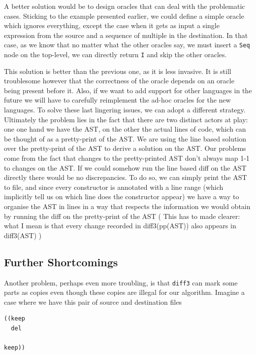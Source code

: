 \documentclass[11pt]{article}
\begin{document}
A better solution would be to design oracles that can deal with the problematic cases. 
Sticking to the example presented earlier, we could define a simple oracle which 
ignores everything, except the case when it gets as input a single expression 
from the source and a sequence of multiple in the destination. In that case, as 
we know that no matter what the other oracles say, we must insert a \texttt{Seq} 
node on the top-level, we can directly return \texttt{I} and skip the other 
oracles. 

This solution is better than the previous one, as it is less invasive. It is 
still troublesome however that the correctness of the oracle depends on an 
oracle being present before it. Also, if we want to add support for other 
languages in the future we will have to carefully reimplement the ad-hoc oracles 
for the new languages. To solve these last lingering issues, we can adopt a 
different strategy. Ultimately the problem lies in the fact that there are two 
distinct actors at play: one one hand we have the AST, on the other the actual lines of 
code, which can be thought of as a pretty-print of the AST. We are using the line based solution 
over the pretty-print of the AST to derive a solution on the AST. Our problems 
come from the fact that changes to the pretty-printed AST don't always map 1-1 
to changes on the AST. If we could somehow run the line based diff on the AST 
directly there would be no discrepancies. To do so, we can simply print the AST 
to file, and since every constructor is annotated with a line range (which implicitly tell us on which line does the constructor appear)
we have a way to organise the AST in lines in a way that respects the 
information we would obtain by running the diff on the pretty-print of the AST ( This has to made clearer: what 
I mean is that every change recorded in diff3(pp(AST)) also appears in diff3(AST) 
)

\subsection{Further Shortcomings}

Another problem, perhaps even more troubling, is that \texttt{diff3} can mark 
some parts as copies even though these copies are illegal for our algorithm. 
Imagine a case where we have this pair of source and destination files

\begin{lstlisting}[language=haskell]
((keep
  del

keep))
\end{lstlisting}
\end{document}
